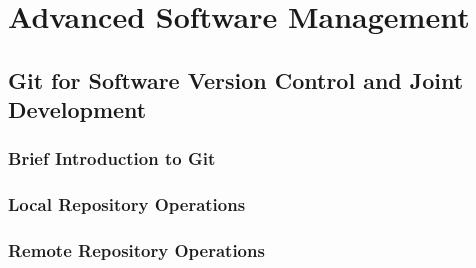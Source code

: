 \chapter{Advanced Software Management}

\section{Git for Software Version Control and Joint Development}

\subsection{Brief Introduction to Git}

\subsection{Local Repository Operations}

\subsection{Remote Repository Operations}


















